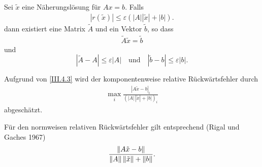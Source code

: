 \begin{Satze}\label{3.4.1}
  Sei $\tilde{ x}$ eine Näherungslösung für 
  $  A  x =  b$. 
  Falls
  \begin{gather}\label{III.4.3}
    |  r(\tilde { x})| \leq \varepsilon ( | A| | \tilde { x} | + |  b|).
  \end{gather}
  dann existiert eine Matrix $\tilde{ A}$  und ein
  Vektor $\tilde { b}$, so dass
  \begin{gather*}
    \tilde{ A} \tilde { x}  =  \tilde{ b} 
  \end{gather*}
  und
  \begin{equation}
    |\tilde{ A} -  A |  \leq  \varepsilon | A|
    \quad \textrm{und} \quad | \tilde{ b} -  b| \leq
    \varepsilon | b|.
    \label{III.4.4}
  \end{equation}
  
  Aufgrund von \eqref{III.4.3} wird der komponentenweise relative
  Rückwärtsfehler durch 
  \begin{gather*}
    \max_i \frac{|  A \tilde{ x} -  b|_i}
    { (| A|\, |\tilde{ x}| + | b|)_i} 
  \end{gather*}
  abgeschätzt.
  
  Für den normweisen relativen Rückwärtsfehler gilt entsprechend
  (Rigal und Gaches 1967)
  \begin{gather*}
    \frac{\nn[A \tilde{x} -  b]}
    { \nn[A] \nn[\tilde{x}] + \nn[b] } .
  \end{gather*}
\end{Satze}

